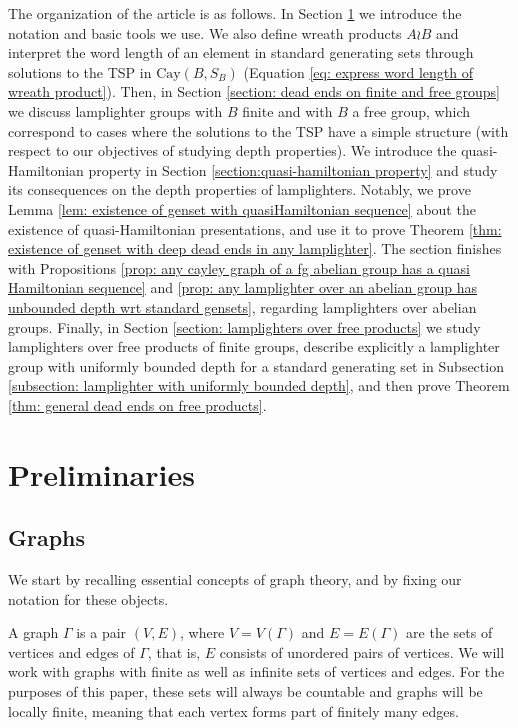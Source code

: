 \documentclass[reqno,oneside]{amsart}
\newcommand{\cay}[2]{\mathrm{Cay}(#1,#2)}
\theoremstyle{plain}
\theoremstyle{definition}
\begin{document}
The organization of the article is as follows. In Section \ref{section: preliminaries} we introduce the notation and basic tools we use. We also define wreath products $A\wr B$ and interpret the word length of an element in standard generating sets through solutions to the TSP in $\cay{B}{S_B}$ (Equation \ref{eq: express word length of wreath product}). Then, in Section \ref{section: dead ends on finite and free groups} we discuss lamplighter groups with $B$ finite and with $B$ a free group, which correspond to cases where the solutions to the TSP have a simple structure (with respect to our objectives of studying depth properties). We introduce the quasi-Hamiltonian property in Section \ref{section:quasi-hamiltonian property} and study its consequences on the depth properties of lamplighters. Notably, we prove Lemma \ref{lem: existence of genset with quasiHamiltonian sequence} about the existence of quasi-Hamiltonian presentations, and use it to prove Theorem \ref{thm: existence of genset with deep dead ends in any lamplighter}. The section finishes with Propositions \ref{prop: any cayley graph of a fg abelian group has a quasi Hamiltonian sequence} and \ref{prop: any lamplighter over an abelian group has unbounded depth wrt standard gensets}, regarding lamplighters over abelian groups. Finally, in Section \ref{section: lamplighters over free products} we study lamplighters over free products of finite groups, describe explicitly a lamplighter group with uniformly bounded depth for a standard generating set in Subsection \ref{subsection: lamplighter with uniformly bounded depth}, and then prove Theorem \ref{thm: general dead ends on free products}. 

\section{Preliminaries}\label{section: preliminaries}
\subsection{Graphs}\label{subsection:graphs}

We start by recalling essential concepts of graph theory, and by fixing our notation for these objects.

A graph $\Gamma$ is a pair $(V,E)$,
where $V=V(\Gamma)$ and $E=E(\Gamma)$ are the sets of vertices and edges of $\Gamma$, that is, $E$ consists of unordered pairs of vertices. We will work with graphs with finite as well as infinite sets of vertices and edges. For the purposes of this paper, these sets will always be countable and graphs will be locally finite, meaning that each vertex forms part of finitely many edges.
\end{document}
